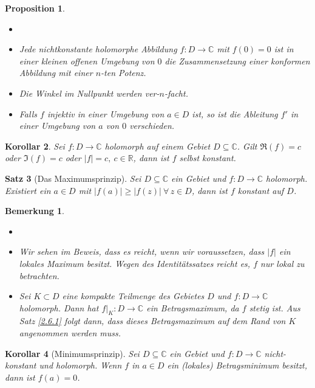 \documentclass[a4paper,12pt]{article}
\theoremstyle{newthm}
\newtheorem{thm}{Satz}[subsection]
\newtheorem{prop}[thm]{Proposition}
\newtheorem{cor}[thm]{Korollar}
\theoremstyle{newdef}
\theoremstyle{newrem}
\newtheorem*{rem}{Bemerkung}
\newcommand{\R}{\mathbb{R}}
\newcommand{\C}{\mathbb{C}}
\newcommand{\bound}[2]{\left.#1\right|_{#2}}
\begin{document}
		\begin{prop}
			\begin{itemize}
				\item[]
				\item Jede nichtkonstante holomorphe Abbildung $f: D \to \C$ mit $f(0) = 0$ ist in einer kleinen offenen Umgebung von $0$ die Zusammensetzung einer konformen Abbildung mit einer $n$-ten Potenz.
				\item Die Winkel im Nullpunkt werden ver-$n$-facht.
				\item Falls $f$ injektiv in einer Umgebung von $a \in D$ ist, so ist die Ableitung $f'$ in einer Umgebung von $a$ von $0$ verschieden.
			\end{itemize}
		\end{prop}
		
		\begin{cor}
			Sei $ f: D \to \C $ holomorph auf einem Gebiet $D \subseteq \C$. Gilt $ \Re(f)=c $ oder $ \Im(f) = c $ oder $ |f|=c,\ c \in \R $, dann ist $f$ selbst konstant.
		\end{cor}
		
		\begin{thm}[Das Maximumsprinzip]
			Sei $ D \subseteq \C $ ein Gebiet und $ f: D \to \C $ holomorph. Existiert ein $a \in D$ mit $ |f(a)| \geq |f(z)| \ \forall\, z \in D $, dann ist $f$ konstant auf $D$.
		\end{thm}
		
		\begin{rem}
			\begin{itemize}
				\item[]
				\item Wir sehen im Beweis, dass es reicht, wenn wir voraussetzen, dass $|f|$ ein lokales Maximum besitzt. Wegen des Identitätssatzes reicht es, $f$ nur lokal zu betrachten.
				\item Sei $ K \subset D $ eine kompakte Teilmenge des Gebietes $D$ und $f : D \to \C$ holomorph. Dann hat $ \bound{f}{K}: D \to \C $ ein Betragsmaximum, da $f$ stetig ist. Aus Satz \ref{2.6.1} folgt dann, dass dieses Betragsmaximum auf dem Rand von $K$ angenommen werden muss.
			\end{itemize}
		\end{rem}
		
		\begin{cor}[Minimumsprinzip]
			Sei $ D \subseteq \C $ ein Gebiet und $ f: D \to \C $ nicht-konstant und holomorph. Wenn $ f $ in $ a \in D $ ein (lokales) Betragsminimum besitzt, dann ist $f(a) = 0$.
		\end{cor}
		
\end{document}
